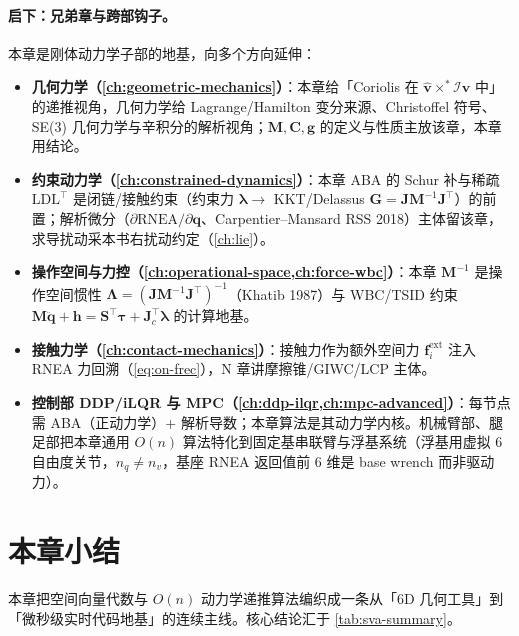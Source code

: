 \paragraph{启下：兄弟章与跨部钩子。}
本章是刚体动力学子部的地基，向多个方向延伸：
\begin{itemize}
  \item \textbf{几何力学（\cref{ch:geometric-mechanics}）}：本章给「Coriolis 在 $\hat{\mathbf v}\times^*\mathcal I\hat{\mathbf v}$ 中」的递推视角，几何力学给 Lagrange/Hamilton 变分来源、Christoffel 符号、SE(3) 几何力学与辛积分的解析视角；$\mathbf M,\mathbf C,\mathbf g$ 的定义与性质主放该章，本章用结论。
  \item \textbf{约束动力学（\cref{ch:constrained-dynamics}）}：本章 ABA 的 Schur 补与稀疏 $\mathrm{LDL}^\top$ 是闭链/接触约束（约束力 $\boldsymbol\lambda\to$ KKT/Delassus $\mathbf G=\mathbf J\mathbf M^{-1}\mathbf J^\top$）的前置；解析微分（$\partial\mathrm{RNEA}/\partial\mathbf q$、Carpentier--Mansard RSS 2018\cite{carpentier2018analytical}）主体留该章，求导扰动采本书右扰动约定（\cref{ch:lie}）。
  \item \textbf{操作空间与力控（\cref{ch:operational-space,ch:force-wbc}）}：本章 $\mathbf M^{-1}$ 是操作空间惯性 $\boldsymbol\Lambda=(\mathbf J\mathbf M^{-1}\mathbf J^\top)^{-1}$（Khatib 1987\cite{khatib1987unified}）与 WBC/TSID 约束 $\mathbf M\ddot{\mathbf q}+\mathbf h=\mathbf S^\top\boldsymbol\tau+\mathbf J_c^\top\boldsymbol\lambda$ 的计算地基。
  \item \textbf{接触力学（\cref{ch:contact-mechanics}）}：接触力作为额外空间力 $\mathbf f_i^{\text{ext}}$ 注入 RNEA 力回溯（\cref{eq:on-frec}），N 章讲摩擦锥/GIWC/LCP 主体。
  \item \textbf{控制部 DDP/iLQR 与 MPC（\cref{ch:ddp-ilqr,ch:mpc-advanced}）}：每节点需 ABA（正动力学）+ 解析导数；本章算法是其动力学内核。机械臂部、腿足部把本章通用 $O(n)$ 算法特化到固定基串联臂与浮基系统（浮基用虚拟 6 自由度关节，$n_q\neq n_v$，基座 RNEA 返回值前 6 维是 base wrench 而非驱动力）。
\end{itemize}

\section*{本章小结}

本章把空间向量代数与 $O(n)$ 动力学递推算法编织成一条从「6D 几何工具」到「微秒级实时代码地基」的连续主线。核心结论汇于 \cref{tab:sva-summary}。

